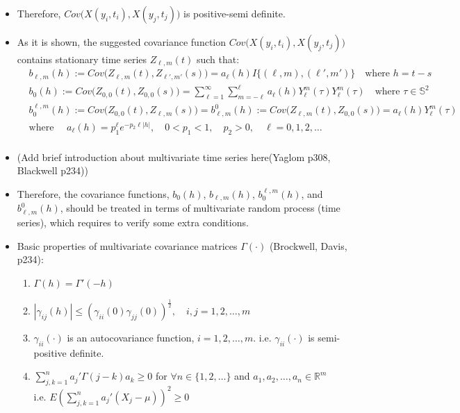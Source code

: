 \documentclass[11pt]{article}
\begin{document}
\begin{itemize}
\item
Therefore, $Cov\biggl(X(y_i,t_i), X(y_j,t_j)\biggl)$ is positive-semi definite.\\

\pagebreak

\item
As it is shown, the suggested covariance function  $Cov\biggl(X(y_i,t_i), X(y_j,t_j)\biggl)$ contains stationary time series $Z_{\ell,m}(t)$ such that:\\
\begin{align*}
&b_{\ell,m}(h) := Cov\biggl( Z_{\ell,m}(t), Z_{\ell',m'}(s) \biggl) = a_{\ell}(h) I\{(\ell,m),(\ell',m')\} \quad \text{where } h=t-s\\
&b_{0}(h) := Cov\biggl( Z_{0,0}(t), Z_{0,0}(s) \biggl) = \sum_{\ell=1}^{\infty} \sum_{m=-\ell}^{\ell} a_{\ell}(h) Y_{\ell}^{m}(\tau) Y_{\ell}^{m}(\tau)  \quad \text{where } \tau \in \mathbb{S}^2 \\
&b_{0}^{\ell,m}(h) := Cov\biggl( Z_{0,0}(t), Z_{\ell,m}(s) \biggl) = b_{\ell,m}^0(h) := Cov\biggl( Z_{\ell,m}(t), Z_{0,0}(s) \biggl) = a_{\ell}(h) Y_{\ell}^{m}(\tau)\\
&\text{where } \quad a_\ell(h)=p_1^\ell e^{-p_2 \ell |h|}, \quad 0<p_1<1, \quad p_2>0, \quad \ell=0,1,2,\dots\\
\end{align*}

\item {\color{red} (Add brief introduction about multivariate time series here(Yaglom p308, Blackwell p234))}\\

\item Therefore, the covariance functions, $b_0(h)$, $b_{\ell, m}(h)$, $b_0^{\ell,m}(h)$, and $b_{\ell,m}^0(h)$, should be treated in terms of multivariate random process (time series), which requires to verify some extra conditions.\\

\item Basic properties of multivariate covariance matrices $\Gamma(\cdot)$ (Brockwell, Davis, p234):\\
\begin{enumerate}
\item $\Gamma(h)=\Gamma'(-h)$
\item $|\gamma_{ij}(h)| \le (\gamma_{ii}(0) \gamma_{jj}(0))^{\frac{1}{2}}, \quad i,j=1,2,\dots, m$
\item $\gamma_{ii}(\cdot)$ is an autocovariance function, $i=1,2,\dots,m$.
i.e. $\gamma_{ii}(\cdot)$ is semi-positive definite.
\item $\sum_{j,k=1}^n a_j' \Gamma(j-k) a_k \ge 0$ for $\forall n \in \{1,2,\dots\}$ and $a_1,a_2,\dots,a_n \in \mathbb{R}^m$\\
i.e. $E(\sum_{j,k=1}^n a_j '(X_j-\mu))^2 \ge 0$\\
\end{enumerate}


\end{itemize}
\end{document}
